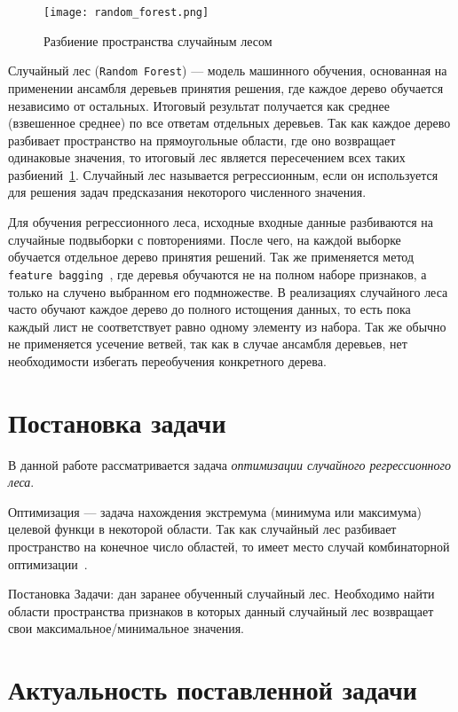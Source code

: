 \begin{figure}[ht!]
\caption{Разбиение пространства случайным лесом}\label{random_forest}
\texttt{[image: random\_forest.png]}
\end{figure}

Случайный лес (\texttt{Random Forest}\cite{randomforest}) --- модель машинного
обучения, основанная на применении ансамбля деревьев принятия решения, где
каждое дерево обучается независимо от остальных. Итоговый результат получается
как среднее (взвешенное среднее) по все ответам отдельных деревьев. Так как
каждое дерево разбивает пространство на прямоугольные области, где оно
возвращает одинаковые значения, то итоговый лес является пересечением всех таких
разбиений~\cref{random_forest}. Случайный лес называется регрессионным, если он
используется для решения задач предсказания некоторого численного значения.

Для обучения регрессионного леса, исходные входные данные разбиваются на случайные
подвыборки с повторениями. После чего, на каждой выборке обучается отдельное
дерево принятия решений. Так же применяется метод \texttt{feature
bagging}~\cite{bagging}, где деревья обучаются не на полном наборе признаков,
а только на случено выбранном его подмножестве. В реализациях случайного леса
часто обучают каждое дерево до полного истощения данных, то есть пока каждый
лист не соответствует равно одному элементу из набора. Так же обычно не
применяется усечение ветвей, так как в случае ансамбля деревьев, нет
необходимости избегать переобучения конкретного дерева.

\section{Постановка задачи}\label{sec:task}

В данной работе рассматривается задача \emph{оптимизации случайного
регрессионного леса}.

Оптимизация --- задача нахождения экстремума (минимума или максимума) целевой
функци в некоторой области. Так как случайный лес разбивает пространство на
конечное число областей, то имеет место случай комбинаторной
оптимизации~\cite{optimize}.

Постановка Задачи: дан заранее обученный случайный лес. Необходимо найти области
пространства признаков в которых данный случайный лес возвращает свои
максимальное/минимальное значения.

\section{Актуальность поставленной задачи}\label{sec:super_task}

